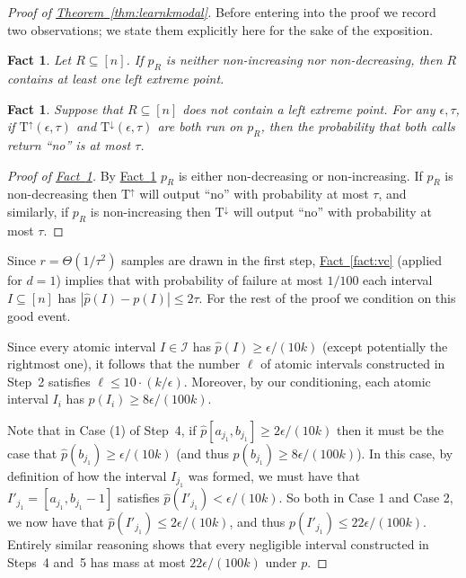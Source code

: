 \documentclass[10pt]{article}
\newtheorem{fact}[theorem]{Fact}
\theoremstyle{definition}
\numberwithin{equation}{section}
\newcommand{\expref}[2]{\texorpdfstring{\hyperref[#2]{#1~\ref{#2}}}{#1~\ref{#2}}}
\newcommand{\eps}{\epsilon}
\newcommand{\wh}[1]{{\widehat{#1}}}
\newcommand{\TND}{{\mathrm{T^{\uparrow}}}}
\newcommand{\TNI}{{\mathrm{T^{\downarrow}}}}
\begin{document}
\begin{proof}[Proof of \expref{Theorem}{thm:learnkmodal}]
Before entering into the proof we record two observations;
we state them explicitly here for the sake of the exposition.


\begin{fact} \label{fact:extreme}
Let $R \subseteq [n]$. If $p_R$ is neither non-increasing nor non-decreasing,
then $R$ contains at least one left extreme point.
\end{fact}


\begin{fact} \label{fact:testie}
Suppose that $R \subseteq [n]$ does not contain a left extreme point.
For any $\eps,\tau$, if $\TND(\eps,\tau)$ and $\TNI(\eps,\tau)$ are both run on $p_R$, then the probability that both calls return ``no'' is at most $\tau$.
\end{fact}

\begin{proof}[Proof of \expref{Fact}{fact:testie}]  By \expref{Fact}{fact:extreme} $p_R$ is either non-decreasing or non-increasing. If $p_R$ is non-decreasing then $\TND$ will output ``no'' with probability at most $\tau$, and similarly, if $p_R$ is non-increasing then $\TNI$ will output ``no'' with probability at most $\tau$.
\end{proof}

Since $r = \Theta(1/\tau^2)$ samples are drawn in the first step,
{\expref{Fact}{fact:vc} (applied for $d=1$)}  implies that with probability of failure at most $1/100$
each interval $I \subseteq [n]$ has $| \wh{p}(I) - p(I) | \leq 2\tau$. For the
rest of the proof we condition on this good event.


Since every atomic interval $I \in \mathcal{I}$ has $\wh{p}(I) \geq
\eps/(10k)$ (except potentially the rightmost one), it follows that the
number $\ell$ of atomic intervals constructed in Step~2 satisfies $\ell \leq
10 \cdot (k/\eps)$. Moreover, {by our conditioning}, each atomic interval $I_i$
has $p(I_i) \geq 8\eps/(100k)$.


Note that in Case (1) of Step~4, if $\widehat{p}[a_{j_1},b_{j_1}] \geq 2\eps/(10k)$
then it must be the case that $\widehat{p}(b_{j_1}) \geq \eps/(10k)$ (and thus
$p(b_{j_1}) \geq 8\eps/(100k)$).  In this case, by definition of how the interval $I_{j_1}$ was formed,
we must have that $I'_{j_1}= [a_{j_1},b_{j_1}-1]$ satisfies $\widehat{p}(I'_{j_1}) < \eps/(10k)$.
So both in Case 1 and Case 2, we now have that $\widehat{p}(I'_{j_1}) \leq 2 \eps/(10k)$, and thus
$p(I'_{j_1}) \leq 22\eps/(100k)$.  Entirely similar reasoning shows that
every negligible interval constructed in Steps~4 and~5 has mass at most $22\eps/(100k)$ under $p$.



\end{proof}
\end{document}
